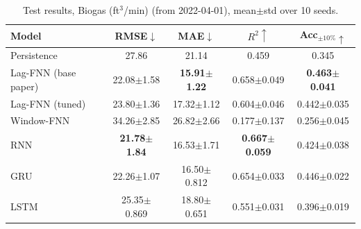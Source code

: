 \begin{table}[!t]
\centering
\caption{Test results, Biogas (ft$^3$/min) (from 2022-04-01), mean$\pm$std over 10 seeds.}
\label{tab:results}
\begin{tabular}{lcccc}
\toprule
Model & RMSE$\downarrow$ & MAE$\downarrow$ & $R^2\uparrow$ & Acc$_{\pm10\%}\uparrow$ \\
\midrule
Persistence & 27.86 & 21.14 & 0.459 & 0.345 \\
Lag-FNN (base paper) & 22.08$\pm$1.58 & \textbf{15.91$\pm$1.22} & 0.658$\pm$0.049 & \textbf{0.463$\pm$0.041} \\
Lag-FNN (tuned) & 23.80$\pm$1.36 & 17.32$\pm$1.12 & 0.604$\pm$0.046 & 0.442$\pm$0.035 \\
Window-FNN & 34.26$\pm$2.85 & 26.82$\pm$2.66 & 0.177$\pm$0.137 & 0.256$\pm$0.045 \\
RNN & \textbf{21.78$\pm$1.84} & 16.53$\pm$1.71 & \textbf{0.667$\pm$0.059} & 0.424$\pm$0.038 \\
GRU & 22.26$\pm$1.07 & 16.50$\pm$0.812 & 0.654$\pm$0.033 & 0.446$\pm$0.022 \\
LSTM & 25.35$\pm$0.869 & 18.80$\pm$0.651 & 0.551$\pm$0.031 & 0.396$\pm$0.019 \\
\bottomrule
\end{tabular}
\end{table}
